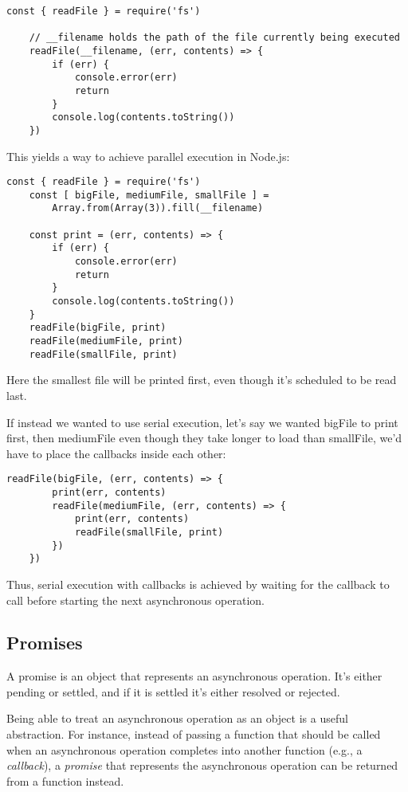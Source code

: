 \documentclass{scrartcl}
\begin{document}
\begin{lstlisting}[style=ES6]
    const { readFile } = require('fs')

    // __filename holds the path of the file currently being executed
    readFile(__filename, (err, contents) => {
        if (err) {
            console.error(err)
            return
        }
        console.log(contents.toString())
    })
\end{lstlisting}

This yields a way to achieve parallel execution in Node.js:

\begin{lstlisting}[style=ES6]
    const { readFile } = require('fs')
    const [ bigFile, mediumFile, smallFile ] =
        Array.from(Array(3)).fill(__filename)

    const print = (err, contents) => {
        if (err) {
            console.error(err)
            return
        }
        console.log(contents.toString())
    }
    readFile(bigFile, print)
    readFile(mediumFile, print)
    readFile(smallFile, print)
\end{lstlisting}

Here the smallest file will be printed first, even though it's scheduled to be read last.

If instead we wanted to use serial execution, let's say we wanted bigFile to print first, then mediumFile even though they take longer to load than smallFile, we'd have to place the callbacks inside each other:

\begin{lstlisting}[style=ES6]
    readFile(bigFile, (err, contents) => {
        print(err, contents)
        readFile(mediumFile, (err, contents) => {
            print(err, contents)
            readFile(smallFile, print)
        })
    })
\end{lstlisting}


Thus, serial execution with callbacks is achieved by waiting for the callback to call before starting the next asynchronous operation.

\subsection{Promises}

A promise is an object that represents an asynchronous operation. It's either pending or settled, and if it is settled it's either resolved or rejected.

Being able to treat an asynchronous operation as an object is a useful abstraction. For instance, instead of passing a function that should be called when an asynchronous operation completes into another function (e.g., a \textit{callback}), a \textit{promise} that represents the asynchronous operation can be returned from a function instead.
\end{document}
